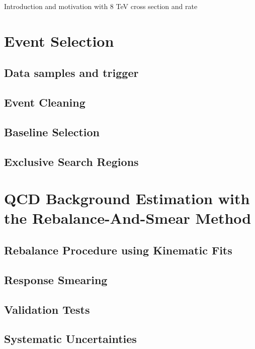 Introduction and motivation with 8 TeV cross section and rate
\section{Event Selection}
\label{sec:RA2_sel}

\subsection{Data samples and trigger}
\label{subsec:RA2_samples_trigger}

\subsection{Event Cleaning}
\label{subsec:RA2_cleaning}

\subsection{Baseline Selection}
\label{subsec:RA2_baseline}

\subsection{Exclusive Search Regions}
\label{subsec:RA2_search_regions}

\section{QCD Background Estimation with the Rebalance-And-Smear Method}
\label{subsec:RA2_QCD}

\subsection{Rebalance Procedure using Kinematic Fits}
\label{subsec:RA2_reb}

\subsection{Response Smearing}
\label{subsec:RA2_smear}

\subsection{Validation Tests}
\label{subsec:RA2_clsoure}

\subsection{Systematic Uncertainties}
\label{subsec:RA2_syst_unc}

